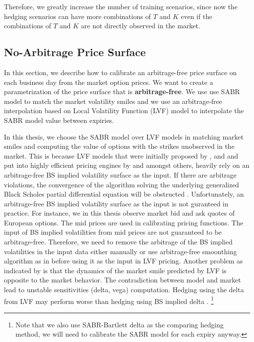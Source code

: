 \documentclass[letterpaper,12pt,titlepage,oneside,final]{book}
\numberwithin{equation}{section}
\theoremstyle{definition}
\begin{document}
Therefore, we greatly increase the number of training scenarios, since now the hedging scenarios can have more combinations of $T$ and $K$ even if the combinations of $T$ and $K$ are not directly observed in the market. 

\subsection{No-Arbitrage Price Surface}
\label{sec:NoArb}
In this section, we describe how to calibrate an arbitrage-free price surface on each business day from the market option prices. We want to create a parametrization of the price surface that is \textbf{arbitrage-free}.  We use use SABR model to match the market volatility smiles and we use an arbitrage-free interpolation based on Local Volatility Function (LVF) model to interpolate the SABR model value between expiries.

In this thesis, we choose the SABR model over LVF models in matching market smiles and computing the value of options with the strikes unobserved in the market. This is because  LVF models that were initially proposed by \citet{dupire1994pricing}, \citet{DermanKani94} and \citet{rubinstein1994implied} and put into highly efficient pricing engines by \citet{Andersenl98} and \citet{dempster2000pricing} amongst others, heavily rely on an arbitrage-free  BS implied volatility surface as the input.  If there are arbitrage violations, the convergence of the algorithm solving the underlying generalized Black Scholes partial differential equation will be obstructed \cite{fengler2009arbitrage}. Unfortunately, an arbitrage-free BS implied volatility surface as the input is not guranteed in practice. For instance, we in this thesis observe market bid and ask quotes of European options. The mid prices are  used in calibrating pricing functions.  The input of BS implied volatilities from mid prices are not guaranteed to be arbitrage-free. Therefore, we need to remove the arbitrage of the BS implied volatilities in the input data either manually or use arbitrage-free smoonthing algorithm as in \cite{fengler2009arbitrage} before using it as the input in LVF pricing. Another problem as indicated by \citet{hagan2002managing} is that the dynamics of the market smile predicted by LVF is opposite to the market behavior. The contradiction between model and market lead to unstable sensitivities (delta, vega) computation. Hedging using the delta from LVF may perform worse than hedging using BS implied delta \cite{hagan2002managing}. \footnote{Note that we also use SABR-Bartlett delta as the comparing hedging method, we will need to calibrate the SABR model for each expiry anyway.}
\end{document}
